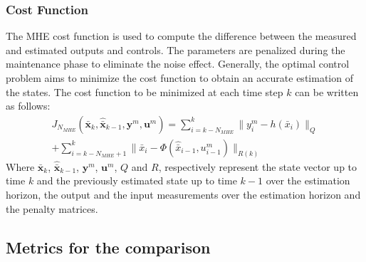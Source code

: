 \subsubsection{Cost Function}
The MHE cost function is used to compute the difference between the measured and estimated outputs and controls. The parameters are penalized during the maintenance phase to eliminate the noise effect. Generally, the optimal control problem aims to minimize the cost function to obtain an accurate estimation of the states.
The cost function to be minimized at each time step $k$ can be written as follows:
\begin{equation}
\begin{split}
        J_{N_{MHE}}(\bar{\mathbf{x}}_k, \hat{\bar{\mathbf{x}}}_{k-1}, \mathbf{y}^m,\mathbf{u}^m) = \sum_{i=k-N_{MHE}}^{k}{\lVert y_i^m-h(\bar{x}_i) \rVert_Q}\\ + \sum_{i=k-N_{MHE}+1}^{k}{\lVert \bar{x}_i-\Phi(\hat{\bar{x}}_{i-1},u^m_{i-1}) \rVert_{R(k)}}
\end{split}
\end{equation}
Where $\bar{\mathbf{x}}_k$, $\hat{\bar{\mathbf{x}}}_{k-1}$, $\mathbf{y}^m$, $\mathbf{u}^m$, $Q$ and $R$, respectively represent the state vector up to time $k$ and the previously estimated state up to time $k-1$ over the estimation horizon, the output and the input measurements over the estimation horizon and the penalty matrices.\\

\subsection{Metrics for the comparison}